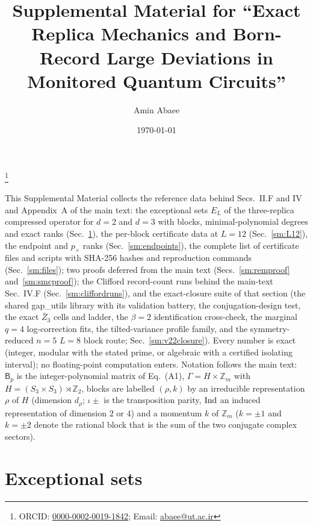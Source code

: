 \documentclass[aps,prx,reprint,superscriptaddress,nobibnotes,longbibliography]{revtex4-2}
\begin{document}
\title{Supplemental Material for ``Exact Replica Mechanics and Born-Record Large Deviations in Monitored Quantum Circuits''}
\author{Amin Abaee}
\thanks{ORCID: \href{https://orcid.org/0000-0002-0019-1842}{0000-0002-0019-1842}; Email: \href{mailto:abaee@ut.ac.ir}{abaee@ut.ac.ir}}
\date{\today}
\maketitle

This Supplemental Material collects the reference data behind Secs.~II.F and IV and Appendix~A of the main text: the exceptional sets $E_L$ of the three-replica compressed operator for $d=2$ and $d=3$ with blocks, minimal-polynomial degrees and exact ranks (Sec.~\ref{sm:E}), the per-block certificate data at $L=12$ (Sec.~\ref{sm:L12}), the endpoint and $p_\times$ ranks (Sec.~\ref{sm:endpoints}), the complete list of certificate files and scripts with SHA-256 hashes and reproduction commands (Sec.~\ref{sm:files}); two proofs deferred from the main text (Secs.~\ref{sm:remproof} and~\ref{sm:smcproof}); the Clifford record-count runs behind the main-text Sec.~IV.F (Sec.~\ref{sm:cliffordruns}), and the exact-closure suite of that section (the shared gap\_utils library with its validation battery, the conjugation-design test, the exact $\bar Z_3$ cells and ladder, the $\beta=2$ identification cross-check, the marginal $q=4$ log-correction fits, the tilted-variance profile family, and the symmetry-reduced $n=5$ $L=8$ block route; Sec.~\ref{sm:v22closure}).  Every number is exact (integer, modular with the stated prime, or algebraic with a certified isolating interval); no floating-point computation enters.  Notation follows the main text: $\mathsf B_p$ is the integer-polynomial matrix of Eq.~(A1), $\Gamma=H\times\mathbb Z_m$ with $H=(S_3\times S_3)\rtimes\mathbb Z_2$, blocks are labelled $(\rho,k)$ by an irreducible representation $\rho$ of $H$ (dimension $d_\rho$; $\iota\pm$ is the transposition parity, ${\rm Ind}$ an induced representation of dimension $2$ or $4$) and a momentum $k$ of $\mathbb Z_m$ ($k=\pm1$ and $k=\pm2$ denote the rational block that is the sum of the two conjugate complex sectors).

\section{Exceptional sets}
\label{sm:E}
\end{document}
